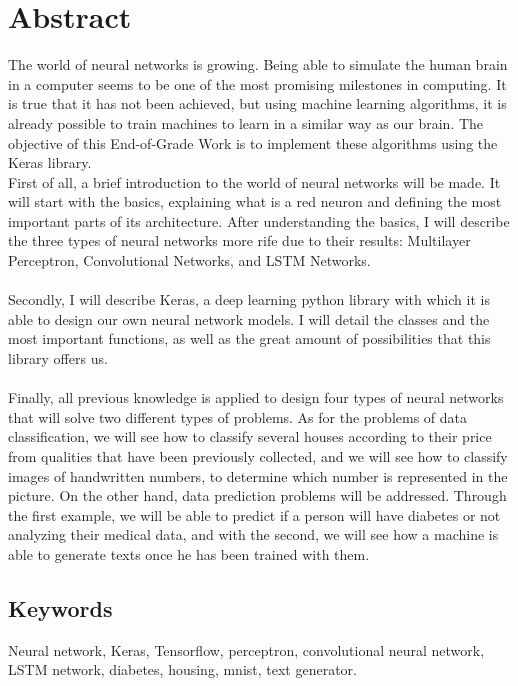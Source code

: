 \newpage
\chapter*{Abstract}
The world of neural networks is growing. Being able to simulate the human brain in a computer seems to be one of the most promising milestones in computing. It is true that it has not been achieved, but using machine learning algorithms, it is already possible to train machines to learn in a similar way as our brain. The objective of  this End-of-Grade Work is to implement these algorithms using the Keras library.\\
First of all, a brief introduction to the world of neural networks will be made. It will start with the basics, explaining what is a red neuron and defining the most important parts of its architecture. After understanding the basics, I will describe the three types of neural networks more rife due to their results: Multilayer Perceptron, Convolutional Networks, and LSTM Networks. \\\\
Secondly, I will describe Keras, a deep learning python library with which it is able to design our own neural network models. I will detail the classes and the most important functions, as well as the great amount of possibilities that this library offers us. \\\\
Finally, all previous knowledge is applied to design four types of neural networks that will solve two different types of problems. As for the problems of data classification, we will see how to classify several houses according to their price from qualities that have been previously collected, and we will see how to classify images of handwritten numbers, to determine which number is represented in the picture. On the other hand, data prediction problems will be addressed. Through the first example, we will be able to predict if a person will have diabetes or not analyzing their medical data, and with the second, we will see how a machine is able to generate texts once he has been trained with them.

\section*{Keywords}
Neural network, Keras, Tensorflow, perceptron, convolutional neural network, LSTM network, diabetes, housing, mnist, text generator.
